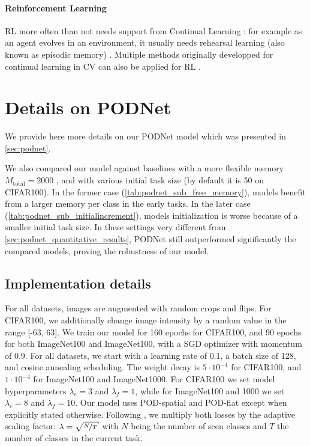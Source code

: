 \label{sec:related_rl}
\paragraph{Reinforcement Learning} \ac{RL} \citep{sutton1998rl} more often than not needs support
from Continual Learning \citep{khetarpal2020continualrl}: for example as an agent evolves in an
environment, it usually needs rehearsal learning (also known as episodic memory)
\citep{mnih2013atarirl}. Multiple methods originally developped for continual learning in \acf{CV}
can also be applied for \ac{RL} \citep{lesort2020continualrobotics}.


\section{Details on PODNet}
\label{sec:appendix_podnet}

We provide here more details on our PODNet model which was presented in \autoref{sec:podnet}.

We also compared our model against baselines with a more flexible memory $M_{\text{total}} = 2000$
\citep{rebuffi2017icarl,wu2019bias_correction}, and with various initial task size (by default it is
50 on CIFAR100). In the former case (\autoref{tab:podnet_sub_free_memory}), models benefit from a
larger memory per class in the early tasks. In the later case
(\autoref{tab:podnet_sub_initialincrement}), models initialization is worse because of a smaller
initial task size. In these settings very different from \autoref{sec:podnet_quantitative_results},
\ac{PODNet} still outperformed significantly the compared models, proving the robustness of our
model.




\subsection{Implementation details}

For all datasets, images are augmented with random crops and flips. For CIFAR100, we additionally
change image intensity by a random value in the range [-63, 63].
%
We train our model for 160 epochs for CIFAR100, and 90 epochs for both ImageNet100 and ImageNet100,
with a SGD optimizer with momentum of 0.9. For all datasets, we start with a learning rate of 0.1, a
batch size of 128, and cosine annealing scheduling.
%
The weight decay is $5\cdot 10^{-4}$ for CIFAR100, and $1\cdot 10^{-4}$ for ImageNet100 and
ImageNet1000. For CIFAR100 we set model hyperparameters $\lambda_c = 3$ and $\lambda_f=1$, while for
ImageNet100 and 1000 we set $\lambda_c = 8$ and $\lambda_f =10$. Our model uses POD-spatial and
POD-flat except when explicitly stated otherwise. Following \citet{hou2019ucir}, we multiply both
losses by the adaptive scaling factor: $\lambda=\sqrt{\nicefrac{N}{T}}$ with $N$ being the number of
seen classes and $T$ the number of classes in the current task.

